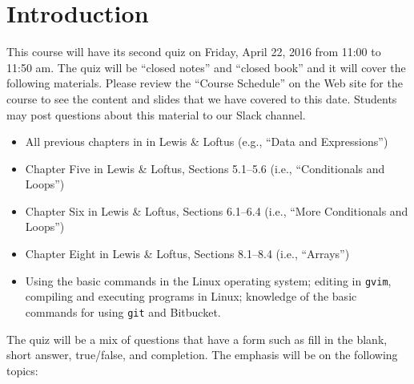 


\section*{Introduction}

This course will have its second quiz on Friday, April 22, 2016 from 11:00 to 11:50 am. The quiz will be ``closed
notes'' and ``closed book'' and it will cover the following materials. Please review the ``Course Schedule'' on the Web
site for the course to see the content and slides that we have covered to this date. Students may post questions about
this material to our Slack channel.

\begin{itemize}

  \itemsep 0in

  \item All previous chapters in in Lewis \& Loftus (e.g., ``Data and Expressions'')

  \item Chapter Five in Lewis \& Loftus, Sections 5.1--5.6 (i.e., ``Conditionals and Loops'')

  \item Chapter Six in Lewis \& Loftus, Sections 6.1--6.4 (i.e., ``More Conditionals and Loops'')

  \item Chapter Eight in Lewis \& Loftus, Sections 8.1--8.4 (i.e., ``Arrays'')

  \item Using the basic commands in the Linux operating system; editing in {\tt gvim}, compiling and executing
    programs in Linux; knowledge of the basic commands for using {\tt git} and Bitbucket.

\end{itemize}

\noindent The quiz will be a mix of questions that have a form such as fill in the blank, short answer, true/false, and
completion.  The emphasis will be on the following topics:


